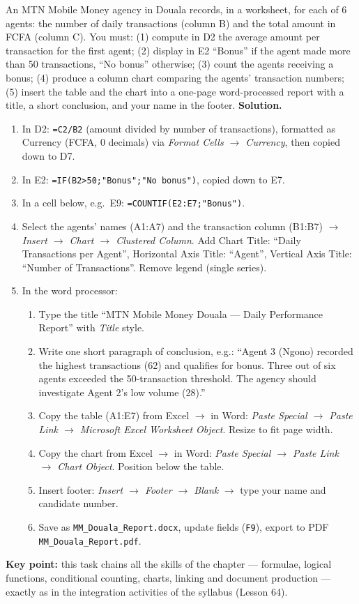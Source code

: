 \documentclass[11pt]{article}
\begin{document}
\begin{exoresolu}
An MTN Mobile Money agency in Douala records, in a worksheet, for each of 6 agents: the number of daily transactions (column B) and the total amount in FCFA (column C). You must: (1) compute in D2 the average amount per transaction for the first agent; (2) display in E2 ``Bonus'' if the agent made more than 50 transactions, ``No bonus'' otherwise; (3) count the agents receiving a bonus; (4) produce a column chart comparing the agents' transaction numbers; (5) insert the table and the chart into a one-page word-processed report with a title, a short conclusion, and your name in the footer.
\tcblower
\textbf{Solution.}
\begin{enumerate}
\item In D2: \texttt{=C2/B2} (amount divided by number of transactions), formatted as Currency (FCFA, 0 decimals) via \emph{Format Cells $\rightarrow$ Currency}, then copied down to D7.
\item In E2: \texttt{=IF(B2>50;"Bonus";"No bonus")}, copied down to E7.
\item In a cell below, e.g.\ E9: \texttt{=COUNTIF(E2:E7;"Bonus")}.
\item Select the agents' names (A1:A7) and the transaction column (B1:B7) $\rightarrow$ \emph{Insert $\rightarrow$ Chart $\rightarrow$ Clustered Column}. Add Chart Title: ``Daily Transactions per Agent'', Horizontal Axis Title: ``Agent'', Vertical Axis Title: ``Number of Transactions''. Remove legend (single series).
\item In the word processor:
\begin{enumerate}
\item Type the title ``MTN Mobile Money Douala --- Daily Performance Report'' with \emph{Title} style.
\item Write one short paragraph of conclusion, e.g.: ``Agent 3 (Ngono) recorded the highest transactions (62) and qualifies for bonus. Three out of six agents exceeded the 50-transaction threshold. The agency should investigate Agent 2's low volume (28).''
\item Copy the table (A1:E7) from Excel $\rightarrow$ in Word: \emph{Paste Special $\rightarrow$ Paste Link $\rightarrow$ Microsoft Excel Worksheet Object}. Resize to fit page width.
\item Copy the chart from Excel $\rightarrow$ in Word: \emph{Paste Special $\rightarrow$ Paste Link $\rightarrow$ Chart Object}. Position below the table.
\item Insert footer: \emph{Insert $\rightarrow$ Footer $\rightarrow$ Blank} $\rightarrow$ type your name and candidate number.
\item Save as \texttt{MM\_Douala\_Report.docx}, update fields (\texttt{F9}), export to PDF \texttt{MM\_Douala\_Report.pdf}.
\end{enumerate}
\end{enumerate}
\textbf{Key point:} this task chains all the skills of the chapter --- formulae, logical functions, conditional counting, charts, linking and document production --- exactly as in the integration activities of the syllabus (Lesson 64).
\end{exoresolu}
\end{document}
